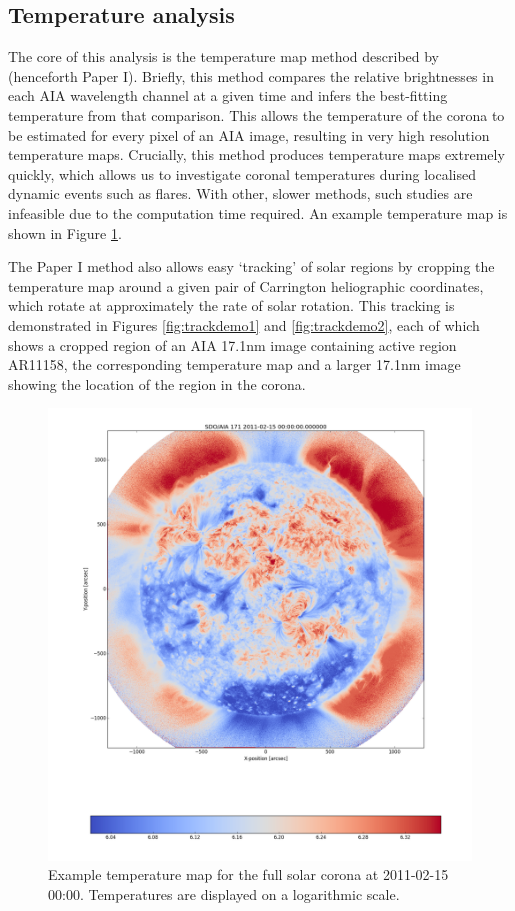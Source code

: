 \documentclass[referee,a4paper,12pt]{swsc}
\begin{document}
\begin{linenumbers}
\subsection{Temperature analysis}
The core of this analysis is the temperature map method described by \cite{Leonard} (henceforth Paper I).
Briefly, this method compares the relative brightnesses in each AIA wavelength channel at a given time and infers the best-fitting temperature from that comparison. %
This allows the temperature of the corona to be estimated for every pixel of an AIA image, resulting in very high resolution temperature maps.
Crucially, this method produces temperature maps extremely quickly, which allows us to investigate coronal temperatures during localised dynamic events such as flares.
With other, slower methods, such studies are infeasible due to the computation time required.
An example temperature map is shown in Figure \ref{fig:example_tmap}.

The Paper I method also allows easy `tracking' of solar regions by cropping the temperature map around a given pair of Carrington heliographic coordinates, which rotate at approximately the rate of solar rotation.
This tracking is demonstrated in Figures \ref{fig:trackdemo1} and \ref{fig:trackdemo2}, each of which shows a cropped region of an AIA 17.1nm image containing active region AR11158, the corresponding temperature map and a larger 17.1nm image showing the location of the region in the corona.

\begin{figure}
	\centering
		\includegraphics[width=\columnwidth]{2011-02-15T00_00_00.png}
	\caption{Example temperature map for the full solar corona at 2011-02-15 00:00. Temperatures are displayed on a logarithmic scale.}
	\label{fig:example_tmap}
\end{figure}


\end{linenumbers}
\end{document}
